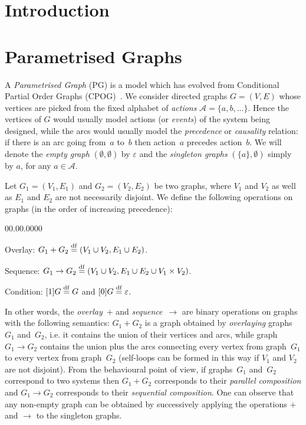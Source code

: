 \section{Introduction}


\section{Parametrised Graphs\label{sec:Parametrised-Graphs}}

A \emph{Parametrised Graph} (PG) is a model which has evolved from
Conditional Partial Order Graphs (CPOG)~\cite{2010_mokhov_ieee}.
We consider directed graphs $G=(V,E)$ whose vertices are picked from
the fixed alphabet of \emph{actions} $\mathcal{A}=\{a,b,...\}$. Hence
the vertices of $G$ would usually model actions (or \emph{events})
of the system being designed, while the arcs would usually model the
\emph{precedence} or \emph{causality} relation: if there is an arc
going from~$a$ to~$b$ then action~$a$ precedes action~$b$.
We will denote the \emph{empty graph} $(\emptyset,\emptyset)$ by
$\varepsilon$ and the \emph{singleton graphs} $(\{a\},\emptyset)$
simply by $a$, for any $a\in\mathcal{A}.$

Let $G_{1}=(V_{1},E_{1})$ and $G_{2}=(V_{2},E_{2})$ be two graphs,
where $V_{1}$ and $V_{2}$ as well as $E_{1}$ and $E_{2}$ are not
necessarily disjoint. We define the following operations on graphs
(in the order of increasing precedence):
\begin{lyxlist}{00.00.0000}
\item [{\hspace{6mm}Overlay:}] $G_{1}+G_{2}\overset{\mathrm{df}}{=}(V_{1}\cup V_{2},E_{1}\cup E_{2})$.
\item [{\hspace{6mm}Sequence:}] $G_{1}\rightarrow G_{2}\overset{\mathrm{df}}{=}(V_{1}\cup V_{2},E_{1}\cup E_{2}\cup V_{1}\times V_{2})$.
\item [{\hspace{6mm}Condition:}] $[1]G\overset{\mathrm{df}}{=} G$ and
$[0]G\overset{\mathrm{df}}{=}\varepsilon$.
\end{lyxlist}
In other words, the \emph{overlay}~$+$ and \emph{sequence}~$\rightarrow$
are binary operations on graphs with the following semantics: $G_{1}+G_{2}$
is a graph obtained by \emph{overlaying} graphs~$G_{1}$ and~$G_{2}$,
i.e. it contains the union of their vertices and arcs, while graph
$G_{1}\rightarrow G_{2}$ contains the union plus the arcs connecting
every vertex from graph~$G_{1}$ to every vertex from graph~$G_{2}$
(self-loops can be formed in this way if $V_{1}$ and $V_{2}$ are
not disjoint). From the behavioural point of view, if graphs~$G_{1}$
and~$G_{2}$ correspond to two systems then $G_{1}+G_{2}$ corresponds
to their \emph{parallel composition} and $G_{1}\rightarrow G_{2}$
corresponds to their \emph{sequential composition}. One can observe
that any non-empty graph can be obtained by successively applying
the operations $+$ and $\rightarrow$ to the singleton graphs.


